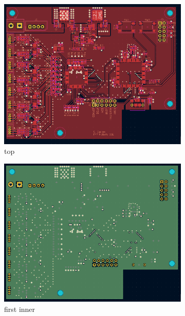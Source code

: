 \documentclass[notitlepage]{report}
\begin{document}
\begin{figure}[H]
\begin{subfigure}{0.5\textwidth}
	\includegraphics[width=.9\textwidth]{./pcb/mother/top.png}
	\centering
	\caption{top}
	\label{fig:design_pcb_mother_top}
	\centering
\end{subfigure}
\begin{subfigure}{0.5\textwidth}
	\includegraphics[width=.9\textwidth]{./pcb/mother/first_inner.png}
	\centering
	\caption{first inner}
	\label{fig:design_pcb_mother_first}
	\centering
\end{subfigure}
\begin{subfigure}{0.5\textwidth}

\end{subfigure}
\end{figure}
\end{document}
